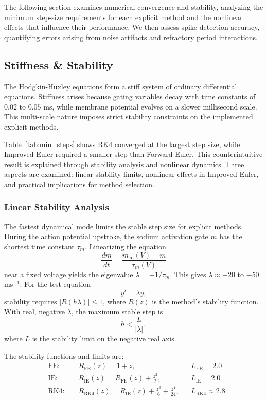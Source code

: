 The following section examines numerical convergence and stability, analyzing the minimum step-size requirements for each explicit method and the nonlinear effects that influence their performance. 
We then assess spike detection accuracy, quantifying errors arising from noise artifacts and refractory period interactions.

\subsection{Stiffness \& Stability}
\label{subsec:stiffness-and-stability}

The Hodgkin-Huxley equations form a stiff system of ordinary differential equations.  
Stiffness arises because gating variables decay with time constants of $0.02$ to $0.05$ ms, while membrane potential evolves on a slower millisecond scale.  
This multi-scale nature imposes strict stability constraints on the implemented explicit methods.

Table~\ref{tab:min_steps} shows RK4 converged at the largest step size, while Improved Euler required a smaller step than Forward Euler.  
This counterintuitive result is explained through stability analysis and nonlinear dynamics.  
Three aspects are examined: linear stability limits, nonlinear effects in Improved Euler, and practical implications for method selection.

\subsubsection{Linear Stability Analysis}

    The fastest dynamical mode limits the stable step size for explicit methods.  
    During the action potential upstroke, the sodium activation gate $m$ has the shortest time constant $\tau_m$.  
    Linearizing the equation
    \[
    \frac{dm}{dt} = \frac{m_\infty(V) - m}{\tau_m(V)}
    \]
    near a fixed voltage yields the eigenvalue $\lambda = -1/\tau_m$.
    This gives $\lambda \approx -20$ to $-50$ ms$^{-1}$.    
    For the test equation
    \[
    y' = \lambda y,
    \]
    stability requires $|R(h\lambda)| \leq 1$, where $R(z)$ is the method's stability function.  
    With real, negative $\lambda$, the maximum stable step is
    \[
    h < \frac{L}{|\lambda|},
    \]
    where $L$ is the stability limit on the negative real axis.
    
    The stability functions and limits are:
    \begin{align*}
        &\text{FE: }  &&R_{\text{FE}}(z) = 1 + z, &&L_{\text{FE}} = 2.0 \\
        &\text{IE: }  &&R_{\text{IE}}(z) = R_{\text{FE}}(z) + \frac{z^2}{2}, &&L_{\text{IE}} = 2.0 \\
        &\text{RK4: } &&R_{\text{RK4}}(z) = R_{\text{IE}}(z) + \frac{z^3}{6} + \frac{z^4}{24}, &&L_{\text{RK4}} \approx 2.8
    \end{align*}
    
